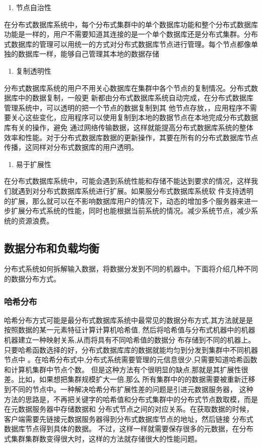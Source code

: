 	\begin{enumerate}[resume]
		\item 节点自治性
	\end{enumerate}

	在分布式数据库系统中，每个分布式集群中的单个数据库功能和整个分布式数据库功能是一样的，用户不需要知道其连接的是一个单个数据库还是分布式集群。分布式数据库的管理可以用统一的方式对分布式数据库节点进行管理。每个节点都像单独的数据库一样，能够自己管理其本地的数据存储

	\begin{enumerate}[resume]
		\item 复制透明性
	\end{enumerate}

	分布式数据库系统的用户不用关心数据库在集群中各个节点的复制情况。分布式数据库中的数据复制，一般更
	新都由分布式数据库系统自动完成，在分布式数据库管理系统中，可以透明的把一个节点的数据复制到其
	他节点存放，，应用程序不需要关心这些变化，应用程序可以使用复制到本地的数据节点在本地完成分布式数据库有关的操作，避免
	通过网络传输数据，这样就能提高分布式数据库系统的整体效率和性能。对于分布式数据库数据的更新操作，其要在所有的分布式数据库节点传播，这同样对分布式数据库的用户透明。

	\begin{enumerate}[resume]
		\item 易于扩展性
	\end{enumerate}

	在分布式数据库系统中，可能会遇到系统性能和存储不能达到要求的情况，这样我们就遇到对分布式数据库系统进行扩展。如果服分布式数据库系统软
	件支持透明的扩展，那么就可以在不影响数据库用户的情况下，动态的增加多个服务器来进一步扩展分布式系统的性能，同时也能根据当前系统的情况。减少系统节点，减少系统的资源浪费。
\subsection{数据分布和负载均衡}
分布式系统如何拆解输入数据，将数据分发到不同的机器中。下面将介绍几种不同的数据分布方式。 
\subsubsection{哈希分布}
哈希分布方式可能是最分布式数据库系统中最常见的数据分布方式,其方法就是是按照数据的某一元素特征计算计算机哈希值,
然后将哈希值与分布式机器中的机器机器建立一种映射关系,从而将具有不同哈希值的数据分
布存储到不同的机器上。
只要哈希函数选择的好，分布式数据库库的数据就能均匀到分发到集群中不同机器节点中
。在哈希分布式中,分布式系统需要管理的元信息很少,只需要知道哈希函数和计算机集群中节点个数。 
但是这种方法有个很明显的缺点,那就是其扩展性很差。比如，如果想把集群规模扩大一倍,那么
所有集群中的的数据需要被重新迁移到不同的节点中。一种解决哈希分布扩展性差的问题是引进元数据服务器， 
这种方法的思路是，不再把关键字的哈希值和分布式集群中的分布式节点数取模，而是在元数据服务器中存储数据和
分布式节点之间的对应关系。在获取数据的时候，客户端需要先链接元数据服务器得到分布式数据库节点的地址，然后链接
分布式数据库节点得到具体的数据。
不过，这样一样就需要保存很多的元数据，在分布式集群集群数变得很大时，这样的方法就存储很大的性能问题。
